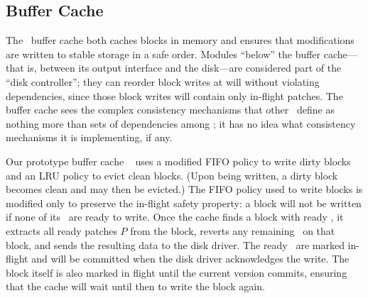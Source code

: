 
\subsection{Buffer Cache}
\label{sec:modules:wbcache}

The \Kudos\ buffer cache both
%
caches blocks in memory and
ensures that modifications are written to stable storage in a safe order.
%
Modules ``below'' the buffer cache---that is, between its output interface
and the disk---are considered part of the ``disk controller''; they can
reorder block writes at will without violating dependencies, since those block
writes will contain only in-flight patches.
%
%
The buffer cache sees the complex
consistency mechanisms that other \modules\ define as nothing more
than sets of dependencies among \patches; it has no idea what consistency
mechanisms it is implementing, if any.

Our prototype buffer cache \module\ 
%
uses a modified FIFO policy to write dirty blocks and an LRU policy to
evict clean blocks.  (Upon being written, a dirty block becomes clean and
may then be evicted.)
%
The FIFO policy used to write blocks is modified only to preserve the
in-flight safety property: a block will not be written if none of its
\patches\ are ready to write.
%
Once the cache finds a block with ready \patches, it extracts all ready
patches $P$ from the block, reverts any remaining \patches\ on that block,
and sends the resulting data to the disk driver.  The ready \patches\ are
marked in-flight and will be committed when the disk driver acknowledges
the write.
%
The block itself is also marked in flight until the current version
commits, ensuring that the cache will wait until then to write the block
again.


